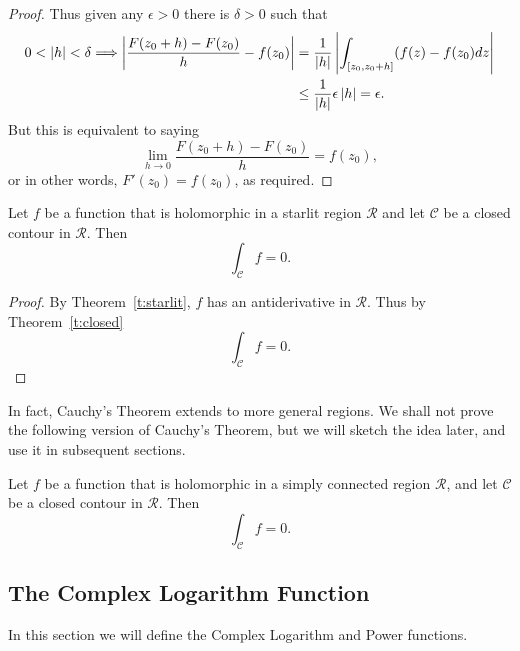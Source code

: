 \begin{proof}
Thus given any $\epsilon>0$ there is $\delta>0$ such that
\begin{align*}
0 < \left| h \right| < \delta \Longrightarrow 
\left|  \frac{F(z_0+h)-F(z_0)}{h}-f(z_0)  \right| & = \frac{1}{\left| h \right|} \left|  \int_{[z_0,z_0+h]} (f(z)-f(z_0) dz  \right| \\
& \leq \frac{1}{\left| h \right|} \epsilon \left| h \right| = \epsilon.
\end{align*}
But this is equivalent to saying
\[
\lim_{h \to 0} \frac{F(z_0+h)-F(z_0)}{h} = f(z_0),
\]
or in other words, $F'(z_0)=f(z_0)$, as required.

\end{proof}
\begin{theorem}
\label{t:cauchyst}
Let $f$ be a function that is holomorphic in a starlit region $\mathcal{R}$ and let $\mathcal{C}$ be a closed contour in $\mathcal{R}$.  Then
\[
\int_{\mathcal{C}} f = 0.
\]
\end{theorem}
\begin{proof}
By Theorem~\ref{t:starlit}, $f$ has an antiderivative in $\mathcal{R}$.  Thus by Theorem~\ref{t:closed}
\[
\int_{\mathcal{C}} f = 0.
\]
\end{proof}
In fact, Cauchy's Theorem extends to more general regions.  We shall not prove the following version of Cauchy's Theorem, but we will sketch the idea later, and use it in subsequent sections.

\begin{theorem}
\label{t:cauchysc}
Let $f$ be a function that is holomorphic in a simply connected region $\mathcal{R}$, and let $\mathcal{C}$ be a closed contour in $\mathcal{R}$. Then
\[
\int_{\mathcal{C}} f = 0.
\]
\end{theorem}

\subsection{The Complex Logarithm Function}

In this section we will define the Complex Logarithm and Power functions.


